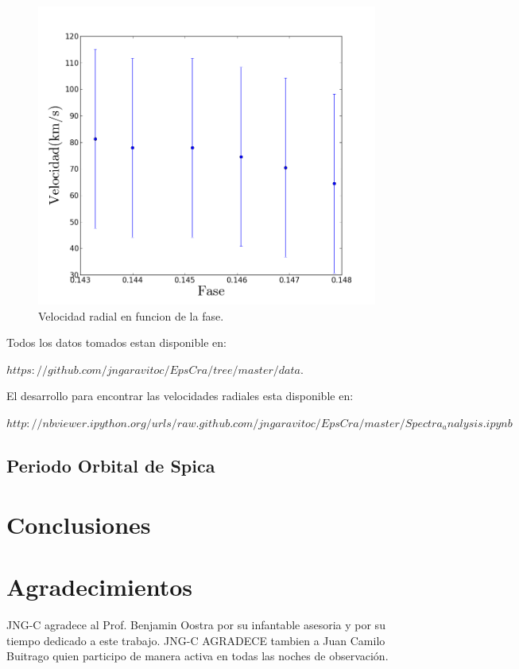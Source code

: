 \documentclass[Proceedings]{ascelike}
\begin{document}
\begin{figure}
\includegraphics[scale=0.5]{velocidadvsfase.png}
\caption{Velocidad radial en funcion de la fase. \label{vvsfase}}
\end{figure}


Todos los datos tomados estan disponible en:

$ https://github.com/jngaravitoc/EpsCra/tree/master/data.$

El desarrollo para encontrar las velocidades radiales esta 
disponible en:

$http://nbviewer.ipython.org/urls/raw.github.com/jngaravitoc/EpsCra/master/Spectra_analysis.ipynb
$
\subsection{Periodo Orbital de Spica}


\section{Conclusiones}

\section{Agradecimientos}

JNG-C agradece al Prof. Benjamin Oostra por su infantable asesoria y por su tiempo dedicado a este trabajo. JNG-C AGRADECE tambien a Juan Camilo Buitrago quien participo de manera activa en todas las noches de observaci\'on.  
\end{document}

